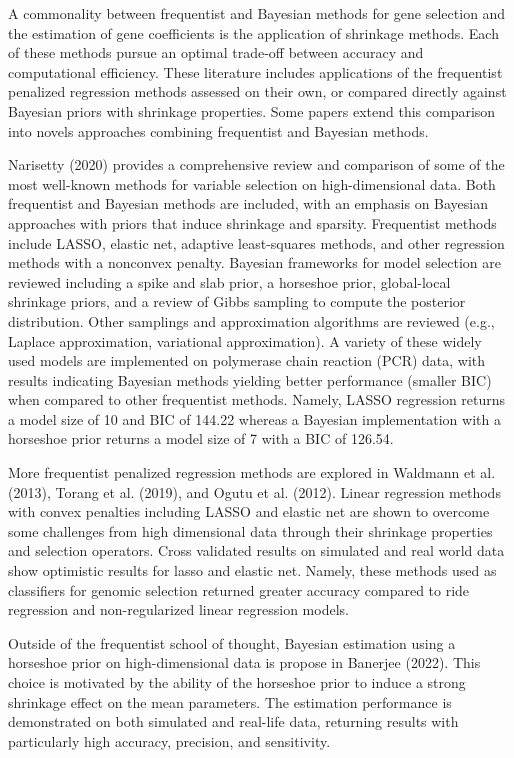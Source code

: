 \documentclass[
	a4paper, %
	10pt, %
	unnumberedsections, %
	twoside, %
]{LTJournalArticle}
\newcommand{\1}{\mathbbm{1}}
\begin{document}
A commonality between frequentist and Bayesian methods for gene selection and the estimation of gene coefficients is the application of shrinkage methods. Each of these methods pursue an optimal trade-off between accuracy and computational efficiency. These literature includes applications of the frequentist penalized regression methods assessed on their own, or compared directly against Bayesian priors with shrinkage properties. Some papers extend this comparison into novels approaches combining frequentist and Bayesian methods. 


Narisetty (2020) provides a comprehensive review and comparison of some of the most well-known methods for variable selection on high-dimensional data. Both frequentist and Bayesian methods are included, with an emphasis on Bayesian approaches with priors that induce shrinkage and sparsity. Frequentist methods include LASSO, elastic net, adaptive least-squares methods, and other regression methods with a nonconvex penalty. Bayesian frameworks for model selection are reviewed including a spike and slab prior, a horseshoe prior, global-local shrinkage priors, and a review of Gibbs sampling to compute the posterior distribution. Other samplings and approximation algorithms are reviewed (e.g., Laplace approximation, variational approximation). A variety of these widely used models are implemented on polymerase chain reaction (PCR) data, with results indicating Bayesian methods yielding better performance (smaller BIC) when compared to other frequentist methods. Namely, LASSO regression returns a model size of 10 and BIC of 144.22 whereas a Bayesian implementation with a horseshoe prior returns a model size of 7 with a BIC of 126.54. 


More frequentist penalized regression methods are explored in Waldmann et al. (2013), Torang et al. (2019), and Ogutu et al. (2012). Linear regression methods with convex penalties including LASSO and elastic net are shown to overcome some challenges from high dimensional data through their shrinkage properties and selection operators. Cross validated results on simulated and real world data show optimistic results for lasso and elastic net. Namely, these methods used as classifiers for genomic selection returned greater accuracy compared to ride regression and non-regularized linear regression models. 


Outside of the frequentist school of thought, Bayesian estimation using a horseshoe prior on high-dimensional data is propose in Banerjee (2022). This choice is motivated by the ability of the horseshoe prior to induce a strong shrinkage effect on the mean parameters. The estimation performance is demonstrated on both simulated and real-life data, returning results with particularly high accuracy, precision, and sensitivity. 
\end{document}
